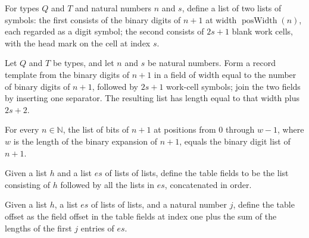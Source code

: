\begin{definition}
\label{Turing.recordTemplate}
\leanok
{}
For types $Q$ and $T$ and natural numbers $n$ and $s$, define a list of two lists of
symbols: the first consists of the binary digits of $n+1$ at width
$\operatorname{posWidth}(n)$, each regarded as a digit symbol; the second consists of
$2s+1$ blank work cells, with the head mark on the cell at index $s$.
\end{definition}

\begin{theorem}
\label{Turing.joinFields_recordTemplate_length}
\leanok
{}
Let $Q$ and $T$ be types, and let $n$ and $s$ be natural numbers. Form a record template
from the binary digits of $n+1$ in a field of width equal to the number of binary digits
of $n+1$, followed by $2s+1$ work-cell symbols; join the two fields by inserting one
separator. The resulting list has length equal to that width plus $2s+2$.
\end{theorem}

\begin{theorem}
\label{Turing.binDigits_posWidth_succ}
\leanok
{}
For every $n\in\mathbb{N}$, the list of bits of $n+1$ at positions from $0$ through
$w-1$, where $w$ is the length of the binary expansion of $n+1$, equals the binary digit
list of $n+1$.
\end{theorem}

\begin{definition}
\label{Turing.tableFields}
\leanok
Given a list $h$ and a list $es$ of lists of lists, define the table fields to be the
list consisting of $h$ followed by all the lists in $es$, concatenated in order.
\end{definition}

\begin{definition}
\label{Turing.tableOffset}
\leanok
{}
Given a list $h$, a list $es$ of lists of lists, and a natural number $j$, define the
table offset as the field offset in the table fields at index one plus the sum of the
lengths of the first $j$ entries of $es$.
\end{definition}

